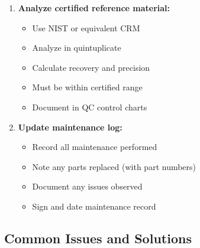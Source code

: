 \documentclass[11pt,a4paper]{article}\usepackage[]{graphicx}\usepackage[]{xcolor}
\begin{document}
\begin{enumerate}[noitemsep]
\begin{itemize}
        \item Document calibration in maintenance log
    \end{itemize}
    \item \textbf{Analyze certified reference material:}
    \begin{itemize}
        \item Use NIST or equivalent CRM
        \item Analyze in quintuplicate
        \item Calculate recovery and precision
        \item Must be within certified range
        \item Document in QC control charts
    \end{itemize}
    \item \textbf{Update maintenance log:}
    \begin{itemize}
        \item Record all maintenance performed
        \item Note any parts replaced (with part numbers)
        \item Document any issues observed
        \item Sign and date maintenance record
    \end{itemize}
\end{enumerate}

\subsection{Common Issues and Solutions}
\end{document}
